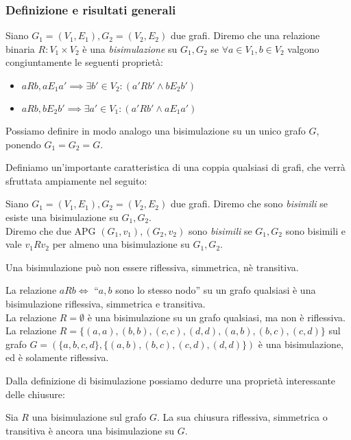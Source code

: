 \subsubsection{Definizione e risultati generali}
\begin{definition}
    Siano $G_1 = (V_1,E_1), G_2 = (V_2,E_2)$ due grafi. Diremo che una relazione binaria $R: V_1 \times V_2$ è una \emph{bisimulazione} su $G_1, G_2$ se $\forall a \in V_1, b \in V_2$ valgono congiuntamente le seguenti proprietà:
    \begin{itemize}
        \item $a R b, a E_1 a' \implies \exists b' \in V_2 : (a' R b' \land b E_2 b')$
        \item $a R b, b E_2 b' \implies \exists a' \in V_1 : (a' R b' \land a E_1 a')$
    \end{itemize}
    Possiamo definire in modo analogo una bisimulazione su un unico grafo $G$, ponendo $G_1 = G_2 = G$.
\end{definition}
Definiamo un'importante caratteristica di una coppia qualsiasi di grafi, che verrà sfruttata ampiamente nel seguito:
\begin{definition}
    Siano $G_1 = (V_1,E_1), G_2 = (V_2,E_2)$ due grafi. Diremo che sono \emph{bisimili} se esiste una bisimulazione su $G_1, G_2$.\\
    Diremo che due APG $(G_1, v_1), (G_2, v_2)$ sono \emph{bisimili} se $G_1, G_2$ sono bisimili e vale $v_1 R v_2$ per almeno una bisimulazione su $G_1, G_2$.
\end{definition}
\begin{observation}
    Una bisimulazione può non essere riflessiva, simmetrica, nè transitiva.
\end{observation}
\begin{example}
    La relazione $a R b \iff$ ``$a,b$ sono lo stesso nodo'' su un grafo qualsiasi è una bisimulazione riflessiva, simmetrica e transitiva.\\
    La relazione $R = \emptyset$ è una bisimulazione su un grafo qualsiasi, ma non è riflessiva.\\
    La relazione $R = \{(a,a),(b,b),(c,c),(d,d),(a,b),(b,c),(c,d)\}$ sul grafo $G = (\{a,b,c,d\}, \{(a,b),(b,c),(c,d),(d,d)\})$ è una bisimulazione, ed è solamente riflessiva.
\end{example}
Dalla definizione di bisimulazione possiamo dedurre una proprietà interessante delle chiusure:
\begin{theorem}
    Sia $R$ una bisimulazione sul grafo $G$. La sua chiusura riflessiva, simmetrica o transitiva è ancora una bisimulazione su $G$.
\end{theorem}
